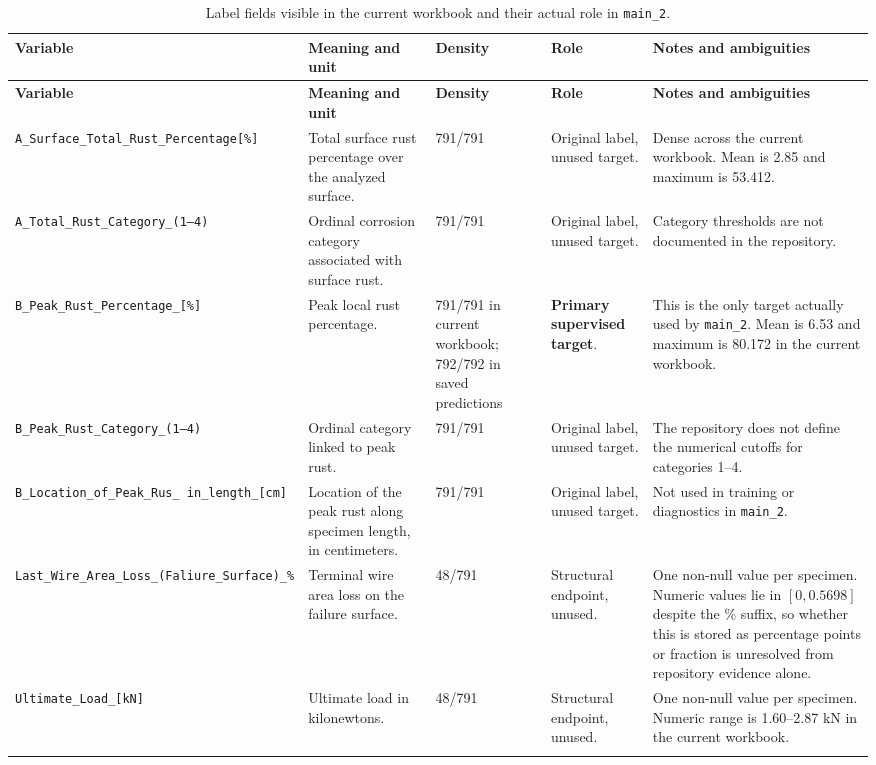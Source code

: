 \documentclass[11pt]{article}
\begin{document}
\begin{longtable}{p{} p{} p{} p{} p{}}
\toprule
\textbf{Variable} & \textbf{Meaning and unit} & \textbf{Density} & \textbf{Role} & \textbf{Notes and ambiguities} \\
\midrule
\endfirsthead
\toprule
\textbf{Variable} & \textbf{Meaning and unit} & \textbf{Density} & \textbf{Role} & \textbf{Notes and ambiguities} \\
\midrule
\endhead
\texttt{A\_Surface\_Total\_Rust\_Percentage[\%]} & Total surface rust percentage over the analyzed surface. & 791/791 & Original label, unused target. & Dense across the current workbook. Mean is 2.85 and maximum is 53.412. \\
\texttt{A\_Total\_Rust\_Category\_(1--4)} & Ordinal corrosion category associated with surface rust. & 791/791 & Original label, unused target. & Category thresholds are not documented in the repository. \\
\texttt{B\_Peak\_Rust\_Percentage\_[\%]} & Peak local rust percentage. & 791/791 in current workbook; 792/792 in saved predictions & \textbf{Primary supervised target}. & This is the only target actually used by \texttt{main\_2}. Mean is 6.53 and maximum is 80.172 in the current workbook. \\
\texttt{B\_Peak\_Rust\_Category\_(1--4)} & Ordinal category linked to peak rust. & 791/791 & Original label, unused target. & The repository does not define the numerical cutoffs for categories 1--4. \\
\texttt{B\_Location\_of\_Peak\_Rus\_\ in\_length\_[cm]} & Location of the peak rust along specimen length, in centimeters. & 791/791 & Original label, unused target. & Not used in training or diagnostics in \texttt{main\_2}. \\
\texttt{Last\_Wire\_Area\_Loss\_(Faliure\_Surface)\_\%} & Terminal wire area loss on the failure surface. & 48/791 & Structural endpoint, unused. & One non-null value per specimen. Numeric values lie in \([0,0.5698]\) despite the \% suffix, so whether this is stored as percentage points or fraction is unresolved from repository evidence alone. \\
\texttt{Ultimate\_Load\_[kN]} & Ultimate load in kilonewtons. & 48/791 & Structural endpoint, unused. & One non-null value per specimen. Numeric range is 1.60--2.87 kN in the current workbook. \\
\bottomrule
\caption{Label fields visible in the current workbook and their actual role in \texttt{main\_2}.}
\label{tab:label_dictionary}
\end{longtable}
\end{document}
